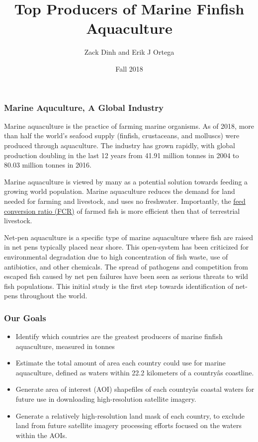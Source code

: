 \documentclass[]{article}
\title{Top Producers of Marine Finfish Aquaculture}
\author{Zack Dinh and Erik J Ortega}
\date{Fall 2018}
\providecommand{\tightlist}{%
  \setlength{\itemsep}{0pt}\setlength{\parskip}{0pt}}
\begin{document}
\maketitle

\subsubsection{Marine Aquculture, A Global
Industry}\label{marine-aquculture-a-global-industry}

Marine aquaculture is the practice of farming marine organisms. As of
2018, more than half the world's seafood supply (finfish, crustaceans,
and molluscs) were produced through aquaculture. The industry has grown
rapidly, with global production doubling in the last 12 years from 41.91
million tonnes in 2004 to 80.03 million tonnes in 2016.

Marine aquaculture is viewed by many as a potential solution towards
feeding a growing world population. Marine aquaculture reduces the
demand for land needed for farming and livestock, and uses no
freshwater. Importantly, the
\href{http://documents.worldbank.org/curated/en/556181468331788600/pdf/788230BRI0AES00without0the0abstract.pdf}{feed
conversion ratio (FCR)} of farmed fish is more efficient then that of
terrestrial livestock.

Net-pen aquaculture is a specific type of marine aquaculture where fish
are raised in net pens typically placed near shore. This open-system has
been criticized for environmental degradation due to high concentration
of fish waste, use of antibiotics, and other chemicals. The spread of
pathogens and competition from escaped fish caused by net pen failures
have been seen as serious threats to wild fish populations. This initial
study is the first step towards identification of net-pens throughout
the world.

\subsubsection{Our Goals}\label{our-goals}

\begin{itemize}
\tightlist
\item
  Identify which countries are the greatest producers of marine finfish
  aquaculture, measured in tonnes
\item
  Estimate the total amount of area each country could use for marine
  aquaculture, defined as waters within 22.2 kilometers of a countryâs
  coastline.
\item
  Generate area of interest (AOI) shapefiles of each countryâs coastal
  waters for future use in downloading high-resolution satellite
  imagery.
\item
  Generate a relatively high-resolution land mask of each country, to
  exclude land from future satellite imagery processing efforts focused
  on the waters within the AOIs.
\end{itemize}
\end{document}
